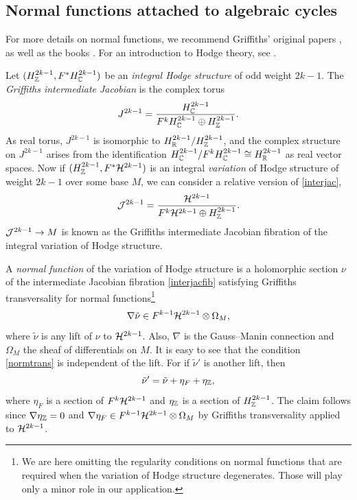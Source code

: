 \subsection{Normal functions attached to algebraic cycles}

For more details on normal functions, we recommend Griffiths' 
original papers \cite{griffiths1,griffithsdiff}, as well as the books
\cite{greencime,voisinbook2}. For an introduction to Hodge theory,
see \cite{voisinbook1}.

Let $(H_{\mathbb Z}^{2k-1},F^*H^{2k-1}_{\mathbb C})$ be an {\it integral Hodge structure} 
of odd weight $2k-1$. The {\it Griffiths intermediate Jacobian} is the complex
torus
\begin{equation}
\eqlabel{interjac}
J^{2k-1} = \frac{H^{2k-1}_\complex}{F^k H^{2k-1}_\complex\oplus H^{2k-1}_\zet} .
\end{equation}
As real torus, $J^{2k-1}$ is isomorphic to $H^{2k-1}_{\mathbb R}/H^{2k-1}_{\mathbb Z}$, and
the complex structure on $J^{2k-1}$ arises from the identification 
$H^{2k-1}_{{\mathbb C}}/F^k H^{2k-1}_{\mathbb C}\cong H^{2k-1}_{\mathbb R}$ as real 
vector spaces. Now if $(H_{\mathbb Z}^{2k-1},F^*{\cal H}^{2k-1})$ 
is an integral {\it variation} of Hodge structure of weight $2k-1$ over some base $M$, 
we can consider a relative version of \eqref{interjac},
\begin{equation}
\eqlabel{interjacfib}
\calj^{2k-1} = \frac{\calh^{2k-1}}{F^k\calh^{2k-1}\oplus H_\zet^{2k-1}} .
\end{equation}
${\cal J}^{2k-1}\to M$ is known as the Griffiths intermediate
Jacobian fibration of the integral variation of Hodge structure.

A {\it normal function} of the variation of Hodge structure is a 
holomorphic section $\nu$ of the intermediate Jacobian fibration 
\eqref{interjacfib} satisfying Griffiths transversality for normal
functions\footnote{We are here omitting the regularity conditions
on normal functions that are required when the variation of Hodge
structure degenerates. Those will play only a minor role in our application.}
\begin{equation}
\eqlabel{normtrans}
\nabla\tilde\nu \in F^{k-1}\calh^{2k-1} \otimes\Omega_M ,
\end{equation}
where $\tilde\nu$ is any lift of $\nu$ to ${\cal H}^{2k-1}$. Also, $\nabla$ 
is the Gauss--Manin connection and $\Omega_M$ the sheaf of differentials 
on $M$. It is easy to see that the condition \eqref{normtrans} is independent
of the lift. For if $\tilde\nu'$ is another lift, then 
\begin{equation}
\tilde\nu'=\tilde\nu +\eta_F+\eta_{\mathbb Z} ,
\end{equation}
where $\eta_F$ is a section of $F^k{\cal H}^{2k-1}$ and $\eta_{\mathbb Z}$ is a
section of $H_{\mathbb Z}^{2k-1}$. The claim follows since $\nabla\eta_{\mathbb Z}=0$ and
$\nabla\eta_F\in F^{k-1}{\cal H}^{2k-1}\otimes \Omega_M$ by Griffiths transversality
applied to ${\cal H}^{2k-1}$.

